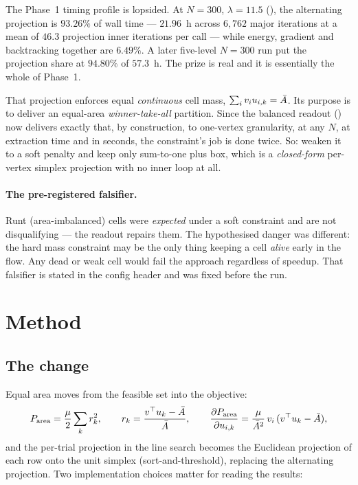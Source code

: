 \documentclass[11pt,a4paper]{article}
\begin{document}
The Phase~1 timing profile is lopsided. At \(N{=}300\), \(\lambda{=}11.5\)
(), the alternating projection is
\(93.26\%\) of wall time --- \(21.96\)~h across \(6{,}762\) major iterations at a
mean of \(46.3\) projection inner iterations per call --- while energy, gradient
and backtracking together are \(6.49\%\). A later five-level \(N{=}300\) run put
the projection share at \(94.80\%\) of \(57.3\)~h. The prize is real and it is
essentially the whole of Phase~1.

That projection enforces equal \emph{continuous} cell mass,
\(\sum_i v_i u_{i,k} = \bar{A}\). Its purpose is to deliver an equal-area
\emph{winner-take-all} partition. Since the balanced readout
() now delivers exactly that,
by construction, to one-vertex granularity, at any \(N\), at extraction time and
in seconds, the constraint's job is done twice. So: weaken it to a soft penalty
and keep only sum-to-one plus box, which is a \emph{closed-form} per-vertex
simplex projection with no inner loop at all.

\paragraph{The pre-registered falsifier.} Runt (area-imbalanced) cells were
\emph{expected} under a soft constraint and are not disqualifying --- the readout
repairs them. The hypothesised danger was different: the hard mass constraint may
be the only thing keeping a cell \emph{alive} early in the flow. Any dead or weak
cell would fail the approach regardless of speedup. That falsifier is stated in
the config header and was fixed before the run.

\section{Method}

\subsection{The change}

Equal area moves from the feasible set into the objective:
\[
  P_{\mathrm{area}} = \frac{\mu}{2}\sum_k r_k^2,
  \qquad r_k = \frac{v^\top u_k - \bar{A}}{\bar{A}},
  \qquad
  \frac{\partial P_{\mathrm{area}}}{\partial u_{i,k}}
    = \frac{\mu}{\bar{A}^{2}}\, v_i \,(v^\top u_k - \bar{A}),
\]
and the per-trial projection in the line search becomes the Euclidean projection
of each row onto the unit simplex (sort-and-threshold), replacing the alternating
projection. Two implementation choices matter for reading the results:
\end{document}
